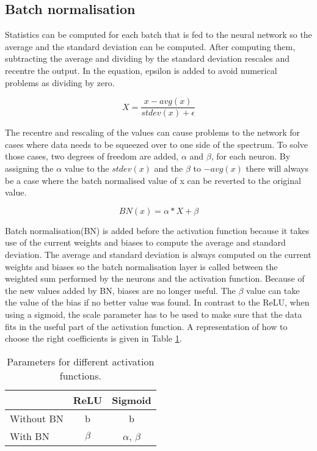 \subsection{Batch normalisation}

Statistics can be computed for each batch that is fed to the neural network so the average and the standard deviation can be computed. After computing them, subtracting the average and dividing by the standard deviation rescales and recentre the output. 
In the equation, epsilon is added to avoid numerical problems as dividing by zero.

\begin{equation}
	X= \dfrac{x - avg(x)}{stdev(x) + \epsilon} 
\end{equation}

The recentre and rescaling of the values can cause problems to
the network for cases where data needs to be squeezed over 
to one side of the spectrum.
To solve those cases, two degrees of freedom are added, 
$\alpha$ and $\beta$, for each neuron. 
By assigning the $\alpha$ value to the $stdev(x)$ and the
$\beta$ to $-avg(x)$ there will always be a case where the batch
normalised value of x can be reverted to the original value.

\begin{equation}
	BN(x) = \alpha * X + \beta
\end{equation}

Batch normalisation(BN) is added before the activation function
because it takes use of the current weights and biases to
compute the average and standard deviation. 
The average and standard deviation is always computed on the
current weights and biases so the batch normalisation layer is
called between the weighted sum performed by the neurons and the
activation function. Because of the new values added by BN,
biases are no longer useful.
The $\beta$ value can take the value of the bias if no better
value was found.
In contrast to the ReLU, when using a sigmoid,
the scale parameter has to be used to make sure that
the data fits in the useful part of the activation function.
A representation of how to choose the right coefficients is
given in Table \ref{tab:Parameters}.

\begin{table}[htbp]
\centering
	\caption{Parameters for different activation functions.}
	\begin{tabular}{l c c}
	\toprule
  		& ReLU & Sigmoid \\\midrule
		Without BN &b & b  \\
		With BN & $\beta$ & $\alpha$, $\beta$  \\
	\bottomrule
	\end{tabular}
\label{tab:Parameters}
\end{table}


